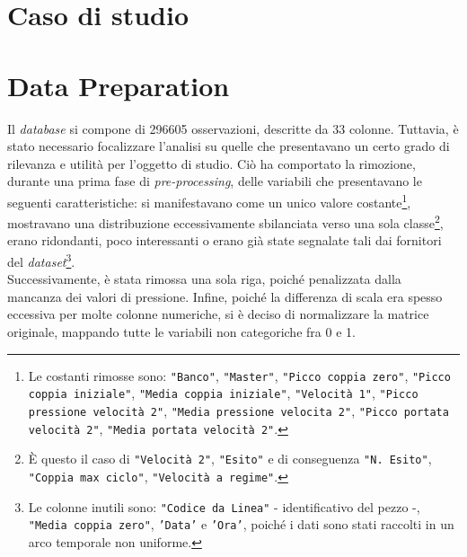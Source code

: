 \documentclass[fleqn,10pt]{SelfArx} %
\affiliation{\textsuperscript{1}\textit{794126, Dipartimento di Informatica, Sistemistica e Comunicazione}} %
\affiliation{\textsuperscript{2}\textit{793516, Dipartimento di Informatica, Sistemistica e Comunicazione}} %
\affiliation{\textsuperscript{3}\textit{?, Dipartimento di Informatica, Sistemistica e Comunicazione}}
\begin{document}
\flushbottom %

\maketitle %

\tableofcontents %

\thispagestyle{empty} %


\section*{Caso di studio} %



\section{Data Preparation}
Il \textit{database} si compone di 296605 osservazioni, descritte da 33 colonne. Tuttavia, è stato necessario focalizzare l'analisi su quelle che presentavano un certo grado di rilevanza e utilità per l'oggetto di studio. Ciò ha comportato la rimozione, durante una prima fase di \textit{pre-processing}, delle variabili che presentavano le seguenti caratteristiche: si manifestavano come un unico valore costante\footnote{Le costanti rimosse sono: \texttt{"Banco"}, \texttt{"Master"}, \texttt{"Picco coppia zero"}, \texttt{"Picco coppia iniziale"}, \texttt{"Media coppia iniziale"}, \texttt{"Velocità 1"}, \texttt{"Picco pressione velocità 2"}, \texttt{"Media pressione velocita 2"}, \texttt{"Picco portata velocità 2"}, \texttt{"Media portata velocità 2"}.}, mostravano una distribuzione eccessivamente sbilanciata verso una sola classe\footnote{È questo il caso di \texttt{"Velocità 2"}, \texttt{"Esito"} e di conseguenza \texttt{"N. Esito"}, \texttt{"Coppia max ciclo"}, \texttt{"Velocità a regime"}.}, erano ridondanti, poco interessanti o erano già state segnalate tali dai fornitori del \textit{dataset}\footnote{Le colonne inutili sono: \texttt{"Codice da Linea"} - identificativo del pezzo -, \texttt{"Media coppia zero"}, \texttt{'Data'} e \texttt{'Ora'}, poiché i dati sono stati raccolti in un arco temporale non uniforme.}.\\
Successivamente, è stata rimossa una sola riga, poiché penalizzata dalla mancanza dei valori di pressione. Infine, poiché la differenza di scala era spesso eccessiva per molte colonne numeriche, si è deciso di normalizzare la matrice originale, mappando tutte le variabili non categoriche fra 0 e 1. 
\end{document}
